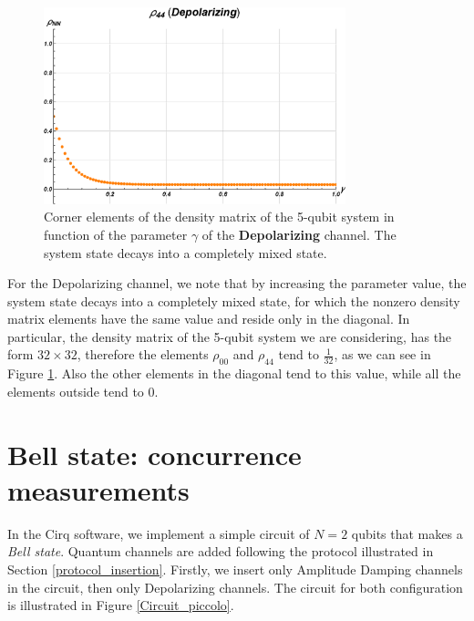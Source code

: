 \begin{figure}[h!]
\begin{minipage}[c]{0.5\linewidth}
\end{minipage}
\begin{minipage}[]{0.5\linewidth}
\centering \includegraphics[width=0.78\textwidth]{./chapter3/Cirq_nuovo/decoerenza/dep_NN.eps}
\end{minipage}
\caption{\label{Depolarizing_matrici} Corner elements of the density matrix of the 5-qubit system in function of the parameter $\gamma$ of the \textbf{Depolarizing} channel. The system state decays into a completely mixed state.}
\end{figure}

\noindent For the Depolarizing channel, we note that by increasing the parameter value, the system state decays into a completely mixed state, for which the nonzero density matrix elements have the same value and reside only in the diagonal. In particular, the density matrix of the 5-qubit system we are considering, has the form $32\times32$, therefore the elements $\rho_{00}$ and $\rho_{44}$ tend to $\frac{1}{32}$, as we can see in Figure \ref{Depolarizing_matrici}. Also the other elements in the diagonal tend to this value, while all the elements outside tend to 0.



\section{Bell state: concurrence measurements}

In the Cirq software, we implement a simple circuit of $N=2$ qubits that makes a \textit{Bell state}. Quantum channels are added following the protocol illustrated in Section \ref{protocol_insertion}. Firstly, we insert only Amplitude Damping channels in the circuit, then only Depolarizing channels.
The circuit for both configuration is illustrated in Figure \ref{Circuit_piccolo}.


